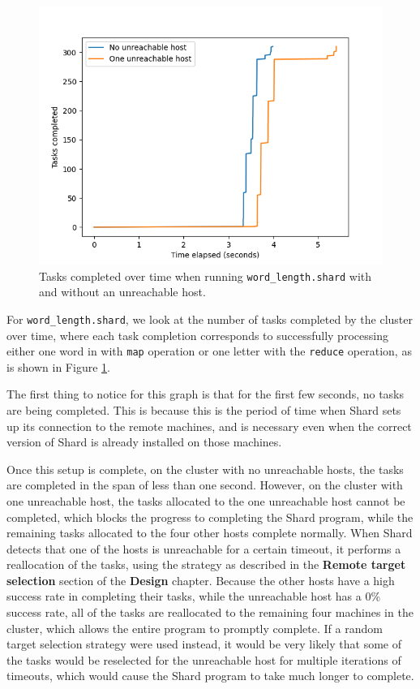 \documentclass[twoside]{report}
\begin{document}
\begin{figure}[h]
  \begin{center}
    \includegraphics[scale=0.9]{img/experiments/e4_1620960581241.png}
    \caption{Tasks completed over time when running \texttt{word\_length.shard} with and without an unreachable host.}
    \label{fig:unreachable}
  \end{center}
\end{figure}

For \texttt{word\_length.shard}, we look at the number of tasks completed by the cluster over time, where each task completion corresponds to successfully processing either one word in with \texttt{map} operation or one letter with the \texttt{reduce} operation, as is shown in Figure \ref{fig:unreachable}.

The first thing to notice for this graph is that for the first few seconds, no tasks are being completed.
This is because this is the period of time when Shard sets up its connection to the remote machines, and is necessary even when the correct version of Shard is already installed on those machines.

Once this setup is complete, on the cluster with no unreachable hosts, the tasks are completed in the span of less than one second.
However, on the cluster with one unreachable host, the tasks allocated to the one unreachable host cannot be completed, which blocks the progress to completing the Shard program, while the remaining tasks allocated to the four other hosts complete normally.
When Shard detects that one of the hosts is unreachable for a certain timeout, it performs a reallocation of the tasks, using the strategy as described in the \textbf{Remote target selection} section of the \textbf{Design} chapter.
Because the other hosts have a high success rate in completing their tasks, while the unreachable host has a 0\% success rate, all of the tasks are reallocated to the remaining four machines in the cluster, which allows the entire program to promptly complete.
If a random target selection strategy were used instead, it would be very likely that some of the tasks would be reselected for the unreachable host for multiple iterations of timeouts, which would cause the Shard program to take much longer to complete.
\end{document}
